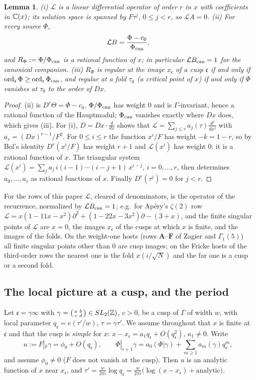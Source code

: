 \documentclass[11pt]{amsart}
\newtheorem{lemma}[theorem]{Lemma}
\theoremstyle{definition}
\theoremstyle{remark}
\newcommand{\ct}{a_0}\renewcommand{\Re}{\operatorname{Re}}\renewcommand{\Im}{\operatorname{Im}}
\newcommand{\cc}{\mathfrak c}\newcommand{\Pc}{\Pi_{\cc}}\newcommand{\Pq}{\Pi^{q}}
\begin{document}
\begin{lemma}\label{lem:L}
(i) $\mathcal L$ is a linear differential operator of order $r$ in $x$ with coefficients in $\mathbb C(x)$; its solution space is spanned by $F\tau^j$, $0\le j<r$, so $\mathcal LA=0$. (ii) For every source $\Phi$,
$$\mathcal LB=\frac{\Phi-c_0}{\Phi_{\rm can}},$$
and $R_\Phi:=\Phi/\Phi_{\rm can}$ is a rational function of $x$; in particular $\mathcal LB_{\rm can}=1$ for the canonical companion. (iii) $R_\Phi$ is regular at the image $x_{\cc}$ of a cusp $\cc$ if and only if $\ord_{\cc}\Phi\ge\ord_{\cc}\Phican$, and regular at a fold $\tau_0$ (a critical point of $x$) if and only if $\Phi$ vanishes at $\tau_0$ to the order of $Dx$.
\end{lemma}
\begin{proof}
(ii) is $D^r\Theta=\Phi-c_0$. $\Phi/\Phi_{\rm can}$ has weight $0$ and is $\Gamma$-invariant, hence a rational function of the Hauptmodul; $\Phi_{\rm can}$ vanishes exactly where $Dx$ does, which gives (iii). For (i), $D=Dx\cdot\frac d{dx}$ shows that $\mathcal L=\sum_{j\le r}a_j(\tau)\frac{d^j}{dx^j}$ with $a_r=(Dx)^{r-1}/F^2$. For $0\le i\le r$ the function $x^i/F$ has weight $-k=1-r$, so by Bol's identity $D^r(x^i/F)$ has weight $r+1$ and $\mathcal L(x^i)$ has weight $0$: it is a rational function of $x$. The triangular system $\mathcal L(x^i)=\sum_ja_j\,i(i-1)\cdots(i-j+1)\,x^{i-j}$, $i=0,\dots,r$, then determines $a_0,\dots,a_r$ as rational functions of $x$. Finally $D^r(\tau^j)=0$ for $j<r$.
\end{proof}

For the rows of this paper $\mathcal L$, cleared of denominators, is the operator of the recurrence, normalized by $\mathcal LB_{\rm can}=1$; e.g.\ for Ap\'ery's $\zeta(2)$ row $\mathcal L=x(1-11x-x^2)\partial^2+(1-22x-3x^2)\partial-(3+x)$, and the finite singular points of $\mathcal L$ are $x=0$, the images $x_{\cc}$ of the cusps at which $x$ is finite, and the images of the folds. On the weight-one hosts (rows $\mathbf A$--$\mathbf F$ of Zagier and $\Gamma_1(5)$) all finite singular points other than $0$ are cusp images; on the Fricke hosts of the third-order rows the nearest one is the fold $x(i/\sqrt N)$ and the far one is a cusp or a second fold.

\subsection{The local picture at a cusp, and the period}
Let $\cc=\gamma\infty$ with $\gamma=\begin{psmallmatrix}a&b\\c&d\end{psmallmatrix}\in SL_2(\mathbb Z)$, $c>0$, be a cusp of $\Gamma$ of width $w$, with local parameter $q_{\cc}=e(\tau'/w)$, $\tau=\gamma\tau'$. We assume throughout that $x$ is finite at $\cc$ and that the cusp is \emph{simple} for $x$: $x-x_{\cc}=a_1q_{\cc}+O(q_{\cc}^2)$, $a_1\ne0$. Write
$$u:=F|_k\gamma=\phi_0+O(q_{\cc}),\qquad \Phi|_{r+1}\gamma=\ct(\Phi|\gamma)+\sum_{m\ge1}a_m(\gamma)q_{\cc}^m,$$
and assume $\phi_0\ne0$ ($F$ does not vanish at the cusp). Then $u$ is an analytic function of $x$ near $x_{\cc}$, and $\tau'=\frac w{2\pi i}\log q_{\cc}=\frac w{2\pi i}\bigl(\log(x-x_{\cc})+\text{analytic}\bigr)$.
\end{document}
